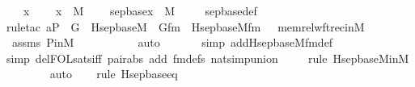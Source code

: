 \begin{isabellebody}
\ \ \ x\ \isanewline
\ \ \ {\isachardoublequoteopen}x\ {\isasymin}\ M{\isachardoublequoteclose}\ \isanewline
\ \ \ {\isachardoublequoteopen}sep{\isacharunderscore}{\kern0pt}base{\isacharparenleft}{\kern0pt}x{\isacharparenright}{\kern0pt}\ {\isasymin}\ M{\isachardoublequoteclose}\ \isanewline
%
\isadelimproof
\isanewline
\ \ %
\endisadelimproof
%
\isatagproof
{}\isamarkupfalse%
\ sep{\isacharunderscore}{\kern0pt}base{\isacharunderscore}{\kern0pt}def\ \isanewline
\ \ \isamarkupfalse%
{\isacharparenleft}{\kern0pt}rule{\isacharunderscore}{\kern0pt}tac\ a{\isacharequal}{\kern0pt}P\ \ G\ {\isacharequal}{\kern0pt}\ Hsep{\isacharunderscore}{\kern0pt}base{\isacharunderscore}{\kern0pt}M\ \ Gfm\ {\isacharequal}{\kern0pt}\ Hsep{\isacharunderscore}{\kern0pt}base{\isacharunderscore}{\kern0pt}M{\isacharunderscore}{\kern0pt}fm\ \ \ memrel{\isacharunderscore}{\kern0pt}wftrec{\isacharunderscore}{\kern0pt}in{\isacharunderscore}{\kern0pt}M{\isacharparenright}{\kern0pt}\isanewline
\ \ \isamarkupfalse%
\ assms\ P{\isacharunderscore}{\kern0pt}in{\isacharunderscore}{\kern0pt}M\ \isanewline
\ \ \ \ \ \ \ \ \isamarkupfalse%
\ auto{\isacharbrackleft}{\kern0pt}{}{\isacharbrackright}{\kern0pt}\isanewline
\ \ \ \ \ \ \isamarkupfalse%
{\isacharparenleft}{\kern0pt}simp\ add{\isacharcolon}{\kern0pt}Hsep{\isacharunderscore}{\kern0pt}base{\isacharunderscore}{\kern0pt}M{\isacharunderscore}{\kern0pt}fm{\isacharunderscore}{\kern0pt}def{\isacharparenright}{\kern0pt}{\isacharplus}{\kern0pt}\isanewline
\ \ \ \ \ \isamarkupfalse%
{\isacharparenleft}{\kern0pt}simp\ del{\isacharcolon}{\kern0pt}FOL{\isacharunderscore}{\kern0pt}sats{\isacharunderscore}{\kern0pt}iff\ pair{\isacharunderscore}{\kern0pt}abs\ add{\isacharcolon}{\kern0pt}\ fm{\isacharunderscore}{\kern0pt}defs\ nat{\isacharunderscore}{\kern0pt}simp{\isacharunderscore}{\kern0pt}union{\isacharparenright}{\kern0pt}\isanewline
\ \ \ \ \isamarkupfalse%
{\isacharparenleft}{\kern0pt}rule\ Hsep{\isacharunderscore}{\kern0pt}base{\isacharunderscore}{\kern0pt}M{\isacharunderscore}{\kern0pt}in{\isacharunderscore}{\kern0pt}M{\isacharparenright}{\kern0pt}\isanewline
\ \ \ \ \ \ \isamarkupfalse%
\ auto{\isacharbrackleft}{\kern0pt}{}{\isacharbrackright}{\kern0pt}\isanewline
\ \ \ \isamarkupfalse%
{\isacharparenleft}{\kern0pt}rule\ Hsep{\isacharunderscore}{\kern0pt}base{\isacharunderscore}{\kern0pt}eq{\isacharparenright}{\kern0pt}\isanewline

\end{isabellebody}
